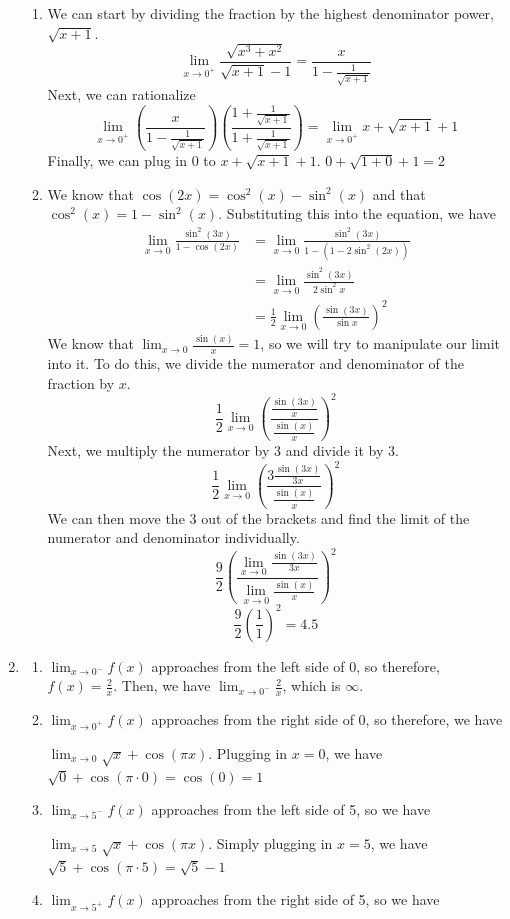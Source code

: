 \documentclass[11pt, letterpaper, twoside]{article}
\begin{document}
\begin{enumerate}
\begin{enumerate}[label=(\alph*)]
\item %
We can start by dividing the fraction by the highest denominator power, $\sqrt{x+1}$.
$$\lim_{x\to0^+} \frac{\sqrt{x^3+x^2}}{\sqrt{x+1}-1}=\frac{x}{1-{\frac{1}{\sqrt{x+1}}}}$$
Next, we can rationalize
$$\lim_{x\to0^+}\left(\frac{x}{1-{\frac{1}{\sqrt{x+1}}}}\right)\left(\frac{1+\frac{1}{\sqrt{x+1}}}{1+\frac{1}{\sqrt{x+1}}}\right)=\lim_{x\to0^+} x+\sqrt{x+1}+1$$
Finally, we can plug in 0 to $x+\sqrt{x+1}+1$. $0+\sqrt{1+0}+1=\boxed{2}$
\item %
We know that $\cos(2x)=\cos^2(x)-\sin^2(x)$ and that $\cos^2(x)=1-\sin^2(x)$. Substituting this into the equation, we have
\begin{align*}
\lim_{x\to0}\frac{\sin^2(3x)}{1-\cos(2x)}&=\lim_{x\to0}\frac{\sin^2(3x)}{1-(1-2\sin^2(2x))}\\
&=\lim_{x\to0}\frac{\sin^2(3x)}{2\sin^2x}\\
&=\frac{1}{2}\lim_{x\to0}\left(\frac{\sin(3x)}{\sin x}\right)^2
\end{align*}
We know that $\lim_{x\to 0}\frac{\sin (x)}{x}=1$, so we will try to manipulate our limit into it. To do this, we divide the numerator and denominator of the fraction by $x$.
$$\frac{1}{2}\lim_{x\to0}\left(\frac{\frac{\sin(3x)}{x}}{\frac{\sin (x)}{x}}\right)^2$$
Next, we multiply the numerator by 3 and divide it by 3.
$$\frac{1}{2}\lim_{x\to0}\left(\frac{3\frac{\sin(3x)}{3x}}{\frac{\sin (x)}{x}}\right)^2$$
We can then move the 3 out of the brackets and find the limit of the numerator and denominator individually.
$$\frac{9}{2}\left(\frac{\lim_{x\to0}\frac{\sin(3x)}{3x}}{\lim_{x\to0}\frac{\sin(x)}{x}}\right)^2$$
$$\frac{9}{2}\left(\frac{1}{1}\right)^2=\boxed{4.5}$$
\end{enumerate}
\item\begin{enumerate}[label=(\alph*)] %
\item %
$\lim_{x\to0^-}f(x)$ approaches from the left side of 0, so therefore, $f(x)=\frac{2}{x}$. Then, we have $\lim_{x\to0^-}\frac{2}{x}$, which is $\boxed{\infty}$.
\item %
$\lim_{x\to0^+}f(x)$ approaches from the right side of 0, so therefore, we have

$\lim_{x\to0}\sqrt x+\cos(\pi x)$. Plugging in $x=0$, we have $\sqrt0+\cos(\pi\cdot0)=\cos(0)=\boxed{1}$
\item %
$\lim_{x\to5^-}f(x)$ approaches from the left side of 5, so we have

$\lim_{x\to5}\sqrt x+\cos(\pi x)$. Simply plugging in $x=5$, we have $\sqrt5+\cos(\pi\cdot5)=\boxed{\sqrt5-1}$
\item %
$\lim_{x\to5^+}f(x)$ approaches from the right side of 5, so we have


\end{enumerate}
\end{enumerate}
\end{document}
